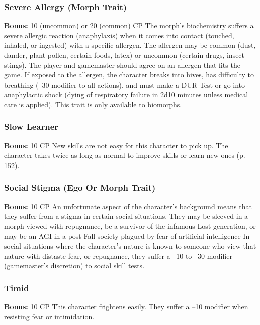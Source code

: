 \subsubsection{Severe Allergy (Morph Trait)}

\textbf{Bonus:} 10 (uncommon) or 20 (common) CP
The morph's biochemistry suffers a severe allergic 
reaction (anaphylaxis) when it comes into contact 
(touched, inhaled, or ingested) with a specific allergen. 
The allergen may be common (dust, dander, plant pollen, 
certain foods, latex) or uncommon (certain drugs, insect 
stings). The player and gamemaster should agree on an 
allergen that fits the game. If exposed to the allergen, 
the character breaks into hives, has difficulty to breathing
(–30 modifier to all actions), and must make a DUR
Test or go into anaphylactic shock (dying of respiratory 
failure in 2d10 minutes unless medical care is applied). 
This trait is only available to biomorphs.

\subsubsection{Slow Learner}

\textbf{Bonus:} 10 CP
New skills are not easy for this character to pick 
up. The character takes twice as long as normal to 
improve skills or learn new ones (p. 152).

\subsubsection{Social Stigma (Ego Or Morph Trait)}

\textbf{Bonus:} 10 CP
An unfortunate aspect of the character's background
means that they suffer from a stigma in
certain social situations. They may be sleeved in 
a morph viewed with repugnance, be a survivor of 
the infamous Lost generation, or may be an AGI in 
a post-Fall society plagued by fear of artificial intelligence
In social situations where the character's nature
is known to someone who view that nature with distaste
fear, or repugnance, they suffer a –10 to –30
modifier (gamemaster's discretion) to social skill tests.

\subsubsection{Timid}

\textbf{Bonus:} 10 CP
This character frightens easily. They suffer a –10 
modifier when resisting fear or intimidation.

